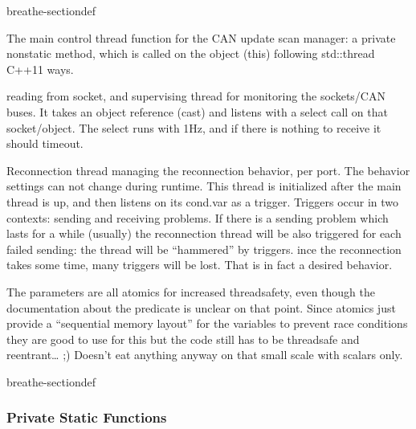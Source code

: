 \documentclass[a4paper,10pt,english]{sphinxmanual}
\begin{document}
\begin{fulllineitems}
\begin{sphinxuseclass}{breathe-sectiondef}
\begin{fulllineitems}
%
\pysigstartmultiline
{}%
\pysigstopmultiline
\sphinxAtStartPar
The main control thread function for the CAN update scan manager: a private non\sphinxhyphen{}static method, which is called on the object (this) following std::thread C++11 ways.

\sphinxAtStartPar
reading from socket, and supervising thread for monitoring the sockets/CAN buses. It takes an object reference (cast) and listens with a select call on that socket/object. The select runs with 1Hz, and if there is nothing to receive it should timeout. 

\end{fulllineitems}



\begin{fulllineitems}
%
\pysigstartmultiline
{}%
\pysigstopmultiline
\sphinxAtStartPar
Reconnection thread managing the reconnection behavior, per port. The behavior settings can not change during runtime. This thread is initialized after the main thread is up, and then listens on its cond.var as a trigger. Triggers occur in two contexts: sending and receiving problems. If there is a sending problem which lasts for a while (usually) the reconnection thread will be also triggered for each failed sending: the thread will be “hammered” by triggers. ince the reconnection takes some time, many triggers will be lost. That is in fact a desired behavior.

\sphinxAtStartPar
The parameters are all atomics for increased thread\sphinxhyphen{}safety, even though the documentation about the predicate is unclear on that point. Since atomics just provide a “sequential memory layout” for the variables to prevent race conditions they are good to use for this but the code still has to be threadsafe and reentrant… ;\sphinxhyphen{}) Doesn’t eat anything anyway on that small scale with scalars only.

\sphinxAtStartPar
{} 

\end{fulllineitems}


\end{sphinxuseclass}
\begin{sphinxuseclass}{breathe-sectiondef}\subsubsection*{Private Static Functions}



\end{sphinxuseclass}
\end{fulllineitems}
\end{document}
